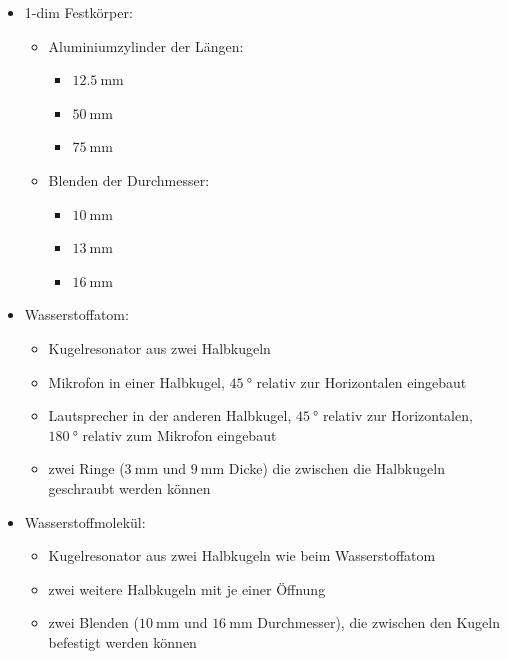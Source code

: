 \begin{itemize}
    \item 1-dim Festkörper:
        \begin{itemize}
            \item Aluminiumzylinder der Längen:
                \begin{itemize}
                    \item $\SI{12,5}{\milli\meter}$ 
                    \item $\SI{50}{\milli\meter}$
                    \item $\SI{75}{\milli\meter}$
                \end{itemize}
            \item Blenden der Durchmesser:
                \begin{itemize}
                    \item $\SI{10}{\milli\meter}$
                    \item $\SI{13}{\milli\meter}$
                    \item $\SI{16}{\milli\meter}$
                \end{itemize}
        \end{itemize}
    \item Wasserstoffatom:
        \begin{itemize}
            \item Kugelresonator aus zwei Halbkugeln
            \item Mikrofon in einer Halbkugel, $\SI{45}{\degree}$ relativ zur Horizontalen eingebaut
            \item Lautsprecher in der anderen Halbkugel, $\SI{45}{\degree}$ relativ zur Horizontalen, $\SI{180}{\degree}$ relativ zum Mikrofon eingebaut
            \item zwei Ringe ($\SI{3}{\milli\meter}$ und $\SI{9}{\milli\meter}$ Dicke) die zwischen die Halbkugeln geschraubt werden können
        \end{itemize}
    \item Wasserstoffmolekül:
        \begin{itemize}
            \item Kugelresonator aus zwei Halbkugeln wie beim Wasserstoffatom
            \item zwei weitere Halbkugeln mit je einer Öffnung
            \item zwei Blenden ($\SI{10}{\milli\meter}$ und $\SI{16}{\milli\meter}$ Durchmesser), die zwischen den Kugeln befestigt werden können
        \end{itemize}
\end{itemize}


